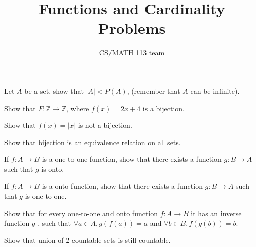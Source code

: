 \documentclass{exam}
\title{Functions and Cardinality Problems}
\author{CS/MATH 113 team}
\begin{document}
\maketitle

\begin{questions}
    \question Let $A$ be a set, show that $|A| < P(A)$, (remember that $A$ can be infinite).
    \begin{solution}
        
    \end{solution}

    \question Show that $F:\mathbb{Z} \rightarrow \mathbb{Z}$, where $f(x) = 2x+4$ is a bijection.
    \begin{solution}
        
    \end{solution}

    \question Show that $f(x) = |x|$ is not a bijection.
    \begin{solution}
        
    \end{solution}

    \question Show that bijection is an equivalence relation on all sets.
    \begin{solution}
        
    \end{solution}

    \question If $f : A \rightarrow B$ is a one-to-one function, show that there exists a function $g : B \rightarrow A$ such that $g$ is onto.
    \begin{solution}
        
    \end{solution}

    \question If $f : A \rightarrow B$ is a onto function, show that there exists a function $g : B \rightarrow A$ such that $g$ is one-to-one.
    \begin{solution}
        
    \end{solution}

    \question Show that for every one-to-one and onto function $f : A \rightarrow B$ it has an inverse function $g$ , such that $\forall a \in A,g(f(a)) = a$ and $\forall b \in B,f(g(b)) = b$.
    \begin{solution}
        
    \end{solution}

    \question Show that union of 2 countable sets is still countable.
    \begin{solution}
        

\end{solution}
\end{questions}
\end{document}
